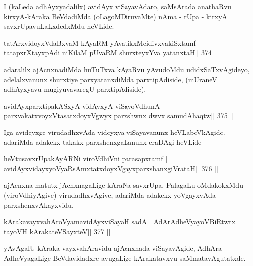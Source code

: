 \begin{artha}
I (kaLeda adhAyxyadalilx) avidAyx viSayavAdaro, saMsArada anathaRvu 
kirxyA-kAraka BeVdadiMda (oLagoMDiruvaMte) nAma - rUpa - kirxyA savxrUpavuLaLxdedxMdu heVLide. 
\end{artha}


\begin{shl}
tatArxvidoyxVdaBxvaM kAyaRM yAvatikxMcidivxvakiSxtamf |
tatapxrXtayxpAdi niKilaM pUvaRM shurxteyxYva yatanxtaH\hfill || 374 ||
\end{shl}

\begin{artha}
adaralilx ajAcnxnadiMda huTuTxva kAyaRvu yAvudoMdu udidxSaTxvAgideyo, 
adelalxvanunx shurxtiye parxyatanxdiMda parxtipAdiside, (mUraneV 
adhAyxyavu mugiyu\-vavaregU parxtipAdiside).
\end{artha}

\begin{shl}
avidAyxparxtipakASxyA vidAyxyA viSayoV\s dhunA |
parxvakatxvoyxV\s tasatxdoyxVgwyx parxshwnx dwvx samudAhaqtw\hfill || 375 ||
\end{shl}

\begin{artha}
Iga avideyxge virudadhxvAda videyxya viSayavanunx heVLabeVkAgide. adariMda adakekx takakx parxshenxgaLanunx eraDAgi heVLide
\end{artha}

\begin{shl}
heVtusavxrUpakAyARNi viroVdhiVni parasapxramf |
avidAyxvidayxyoVyaRsAmxtatxdoyxVgayxparxshanxgiVrataH\hfill || 376 ||
\end{shl}

\begin{artha}
ajAcnxna-matutx jAcnxnagaLige kAraNa-savxrUpa, PalagaLu oMdakokxMdu  (viroVdhi\-yAgive) virudadhxvAgive, adariMda adakekx yoVgayxvAda parxshenxvAkayxvidu.
\end{artha}

\begin{shl}
kArakavayxvahAroV\s yamavidAyxviSayaH sadA |
AdArAdheVyayoVBiRtwtx tayoVH kArakateVSayxteV\hfill || 377 ||
\end{shl}

\begin{artha}
yAvAgalU kAraka vayxvahAravidu ajAcnxnada viSayavAgide, AdhAra -  AdheVyagaLige BeVdavidadxre avugaLige kArakatavxvu saMmatavAgutatxde.
\end{artha}

